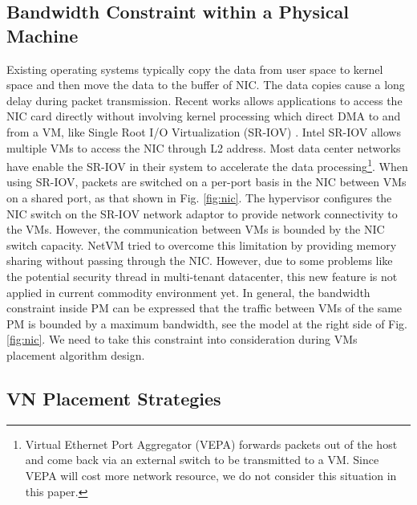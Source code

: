 \documentclass[10pt, conference, letterpaper]{IEEEtran}
\begin{document}
\subsection{Bandwidth Constraint within a Physical Machine}

Existing operating systems typically copy the data from user space to kernel space and then move the data to the buffer of NIC. The data copies cause a long delay during packet transmission. Recent works allows applications to access the NIC card directly without involving kernel processing which direct DMA to and from a VM, like Single Root I/O Virtualization (SR-IOV) \cite{sriov}. Intel SR-IOV allows multiple VMs to access the NIC through L2 address. Most data center networks have enable the SR-IOV in their system to accelerate the data processing\footnote{Virtual Ethernet Port Aggregator (VEPA) forwards packets out of the host and come back via an external switch to be transmitted to a VM. Since VEPA will cost more network resource, we do not consider this situation in this paper.}. When using SR-IOV, packets are switched on a per-port basis in the NIC between VMs on a shared port, as that shown in Fig. \ref{fig:nic}. The hypervisor configures the NIC switch on the SR-IOV network adaptor to provide network connectivity to the VMs. However, the communication between VMs is bounded by the NIC switch capacity. NetVM \cite{netvm} tried to overcome this limitation by providing  memory sharing without passing through the NIC. However, due to some problems like the potential security thread in multi-tenant datacenter, this new feature is not applied in current commodity environment yet. In general, the bandwidth constraint inside PM can be expressed that the traffic between VMs of the same PM is bounded by a maximum bandwidth, see the model at the right side of Fig. \ref{fig:nic}. We need to take this constraint into consideration during VMs placement algorithm design.


\subsection{VN Placement Strategies}\label{sec:placement}

\end{document}
